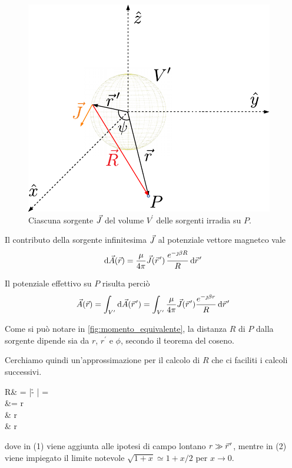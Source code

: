 \begin{figure}[htp]
	\centering
	\includegraphics[]{img/momento_equivalente.pdf}
	\caption{Ciascuna sorgente $\vec{J}$ del volume $V^\prime$ delle sorgenti irradia su $P$.}
	\label{fig:momento_equivalente}
\end{figure}

Il contributo della sorgente infinitesima $\vec{J}$ al potenziale vettore magnetco vale
\begin{equation}
	\de \A(\r)
	= \frac{\mu}{4\pi} \J(\rp) \, \frac{e^{-\jmath \beta R}}{R} \de \rp
\end{equation}

Il potenziale effettivo su $P$ risulta perciò
\begin{equation} \label{eq:A_di_P}
	\A(\r)=\int_{V^\prime} \de \A(\rp) =\int_{V^\prime} \frac{\mu}{4\pi} \J(\rp) \frac{\ejbr}{R} \de \rp
\end{equation}

Come si può notare in \autoref{fig:momento_equivalente}, la distanza $R$ di $P$ dalla sorgente dipende sia da $r$, $r^\prime$ e $\phi$, secondo il teorema del coseno.

Cerchiamo quindi un'approssimazione per il calcolo di $R$ che ci faciliti i calcoli successivi.

\begin{esp} \label{eq:approssimazione_per_R}
	R&
	= |\r - \rp|
	=  \\
	&= r \,  \\
	& r \,  \\
	& r 
\end{esp}
dove in (1) viene aggiunta alle ipotesi di campo lontano $r \gg \rp$, mentre in (2) viene impiegato il limite notevole $\sqrt{1 + x} \simeq 1 + x/2$ per $x \to 0$.

